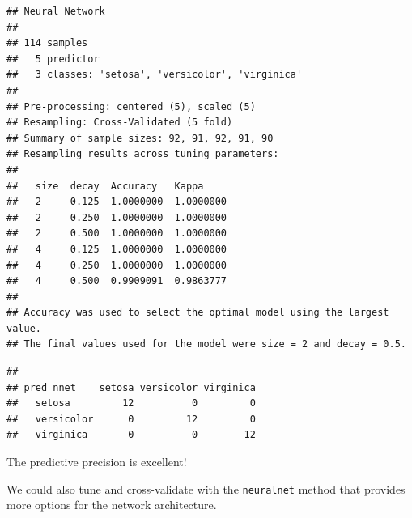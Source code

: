 \documentclass[
]{article}
\newenvironment{Shaded}{\begin{snugshade}}{\end{snugshade}}
\newcommand{\CommentTok}[1]{\textcolor[rgb]{0.56,0.35,0.01}{\textit{#1}}}
\newcommand{\FunctionTok}[1]{\textcolor[rgb]{0.13,0.29,0.53}{\textbf{#1}}}
\newcommand{\NormalTok}[1]{#1}
\newcommand{\OtherTok}[1]{\textcolor[rgb]{0.56,0.35,0.01}{#1}}
\newcommand{\SpecialCharTok}[1]{\textcolor[rgb]{0.81,0.36,0.00}{\textbf{#1}}}
\begin{document}
\begin{verbatim}
## Neural Network 
## 
## 114 samples
##   5 predictor
##   3 classes: 'setosa', 'versicolor', 'virginica' 
## 
## Pre-processing: centered (5), scaled (5) 
## Resampling: Cross-Validated (5 fold) 
## Summary of sample sizes: 92, 91, 92, 91, 90 
## Resampling results across tuning parameters:
## 
##   size  decay  Accuracy   Kappa    
##   2     0.125  1.0000000  1.0000000
##   2     0.250  1.0000000  1.0000000
##   2     0.500  1.0000000  1.0000000
##   4     0.125  1.0000000  1.0000000
##   4     0.250  1.0000000  1.0000000
##   4     0.500  0.9909091  0.9863777
## 
## Accuracy was used to select the optimal model using the largest value.
## The final values used for the model were size = 2 and decay = 0.5.
\end{verbatim}

\begin{Shaded}
\end{Shaded}

\begin{verbatim}
##             
## pred_nnet    setosa versicolor virginica
##   setosa         12          0         0
##   versicolor      0         12         0
##   virginica       0          0        12
\end{verbatim}

The predictive precision is excellent!

We could also tune and cross-validate with the \texttt{neuralnet} method
that provides more options for the network architecture.
\end{document}
